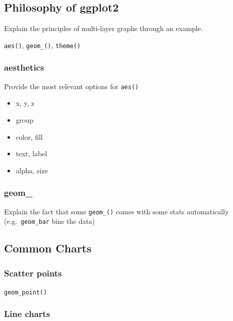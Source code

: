 \documentclass[
]{book}
\providecommand{\tightlist}{%
  \setlength{\itemsep}{0pt}\setlength{\parskip}{0pt}}
\begin{document}
\hypertarget{philosophy-of-ggplot2}{%
\subsection{Philosophy of ggplot2}\label{philosophy-of-ggplot2}}

Explain the principles of multi-layer graphs through an example.

\texttt{aes()}, \texttt{geom\_()}, \texttt{theme()}

\hypertarget{aesthetics}{%
\subsubsection{aesthetics}\label{aesthetics}}

Provide the most relevant options for \texttt{aes()}

\begin{itemize}
\tightlist
\item
  x, y, z
\item
  group
\item
  color, fill
\item
  text, label
\item
  alpha, size
\end{itemize}

\hypertarget{geom_}{%
\subsubsection{geom\_}\label{geom_}}

Explain the fact that some \texttt{geom\_()} comes with some stats automatically (e.g.~\texttt{geom\_bar} bins the data)

\hypertarget{common-charts}{%
\subsection{Common Charts}\label{common-charts}}

\hypertarget{scatter-points}{%
\subsubsection{Scatter points}\label{scatter-points}}

\texttt{geom\_point()}

\hypertarget{line-charts}{%
\subsubsection{Line charts}\label{line-charts}}
\end{document}
